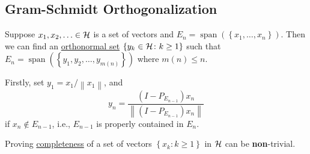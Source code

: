 \subsection{Gram-Schmidt Orthogonalization}

Suppose \(x_1, x_2, \ldots \in \mathcal{\MakeUppercase{h}}\) is a set of vectors and \(E_n = \mathop{\mathrm{span}}(\left\{ x_1, \ldots , x_n \right\} )\). Then we can find an \hyperref[def:orthonormal-system]{orthonormal set} \(\left\{ y_{k} \in \mathcal{\MakeUppercase{h}} \colon k\geq 1 \right\}\) such that \(E_n = \mathop{\mathrm{span}}(\left\{ y_1, y_2, \ldots , y_{m(n)}  \right\} )\) where \(m(n) \leq n\).

Firstly, set \(y_1 = x_1 / \left\lVert x_1\right\rVert \), and
\[
	y_n = \frac{(I - P_{E_{n-1}})x_n}{\left\lVert (I - P_{E_{n-1}})x_n \right\rVert}
\]
if \(x_n \notin E_{n-1}\), i.e., \(E_{n-1}\) is properly contained in \(E_n\).

\begin{remark}
	Proving \hyperref[def:complete-system]{completeness} of a set of vectors \(\left\{ x_k \colon k\geq 1 \right\} \) in \(\mathcal{\MakeUppercase{h}} \) can be \textbf{non}-trivial.
\end{remark}

